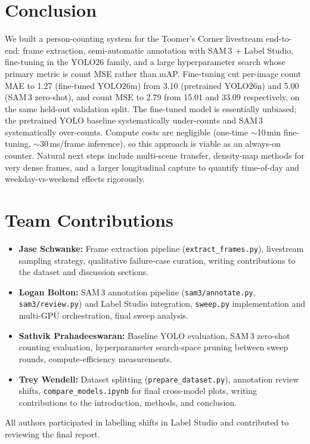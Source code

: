 \documentclass{article}
\begin{document}
\section{Conclusion}
We built a person-counting system for the Toomer's Corner
livestream end-to-end: frame extraction, semi-automatic
annotation with SAM\,3 + Label Studio, fine-tuning in the YOLO26
family, and a large hyperparameter search whose primary metric is
count MSE rather than mAP. Fine-tuning cut per-image count MAE to 1.27 (fine-tuned YOLO26m)
from 3.10 (pretrained YOLO26n) and 5.00 (SAM\,3 zero-shot), and
count MSE to 2.79 from 15.01 and 33.09 respectively, on the same
held-out validation split. The fine-tuned model is essentially
unbiased; the pretrained YOLO baseline systematically under-counts
and SAM\,3 systematically over-counts. Compute costs are negligible
(one-time $\sim$10\,min fine-tuning, $\sim$30\,ms/frame
inference), so this approach is viable as an always-on counter.
Natural next steps include multi-scene transfer, density-map
methods for very dense frames, and a larger longitudinal capture
to quantify time-of-day and weekday-vs-weekend effects rigorously.

\section{Team Contributions}
\begin{itemize}[leftmargin=1.5em]
    \item \textbf{Jase Schwanke:} Frame extraction pipeline
    (\texttt{extract\_frames.py}), livestream sampling strategy,
    qualitative failure-case curation, writing contributions to
    the dataset and discussion sections.
    \item \textbf{Logan Bolton:} SAM\,3 annotation pipeline
    (\texttt{sam3/annotate.py}, \texttt{sam3/review.py}) and
    Label Studio integration, \texttt{sweep.py} implementation
    and multi-GPU orchestration, final sweep analysis.
    \item \textbf{Sathvik Prahadeeswaran:} Baseline YOLO
    evaluation, SAM\,3 zero-shot counting evaluation,
    hyperparameter search-space pruning between sweep rounds,
    compute-efficiency measurements.
    \item \textbf{Trey Wendell:} Dataset splitting
    (\texttt{prepare\_dataset.py}), annotation review shifts,
    \texttt{compare\_models.ipynb} for final cross-model plots,
    writing contributions to the introduction, methods, and
    conclusion.
\end{itemize}
All authors participated in labelling shifts in Label Studio and
contributed to reviewing the final report.
\end{document}
